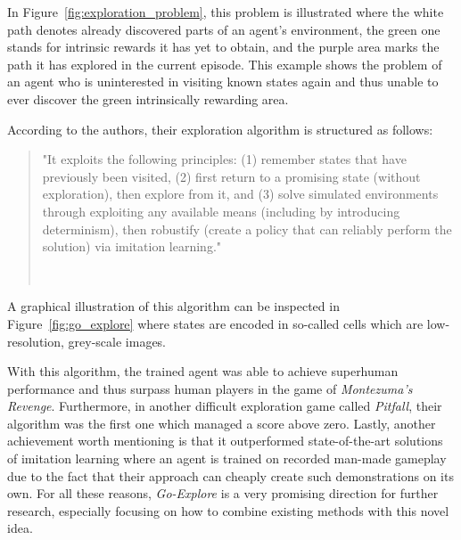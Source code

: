 \documentclass[draft,final]{vutinfth} %
\newcommand{\p}[1]{see p. #1}
\begin{document}
    \footnotetext{\citep[\p{3}]{ecoffet_go-explore_2019}}

    In Figure~\ref{fig:exploration_problem}, this problem is illustrated where the white path denotes already discovered parts of an agent's environment, the green one stands for intrinsic rewards it has yet to obtain, and the purple area marks the path it has explored in the current episode.
    This example shows the problem of an agent who is uninterested in visiting known states again and thus unable to ever discover the green intrinsically rewarding area.

    According to the authors, their exploration algorithm is structured as follows:


    \begin{quote}
        "It exploits the following principles: (1) remember states that have
        previously been visited, (2) first return to a promising state (without exploration),
        then explore from it, and (3) solve simulated environments through exploiting any
        available means (including by introducing determinism), then robustify (create a
        policy that can reliably perform the solution) via imitation learning."

        \hfill~\cite[\p{1}]{ecoffet_go-explore_2019}
    \end{quote}

    A graphical illustration of this algorithm can be inspected in Figure~\ref{fig:go_explore} where states are encoded in so-called cells which are low-resolution, grey-scale images.

    With this algorithm, the trained agent was able to achieve superhuman performance and thus surpass human players in the game of \textit{Montezuma's Revenge}.
    Furthermore, in another difficult exploration game called \textit{Pitfall}, their algorithm was the first one which managed a score above zero.
    Lastly, another achievement worth mentioning is that it outperformed state-of-the-art solutions of imitation learning where an agent is trained on recorded man-made gameplay due to the fact that their approach can cheaply create such demonstrations on its own.
    For all these reasons, \textit{Go-Explore} is a very promising direction for further research, especially focusing on how to combine existing methods with this novel idea.

    \newpage
\end{document}
